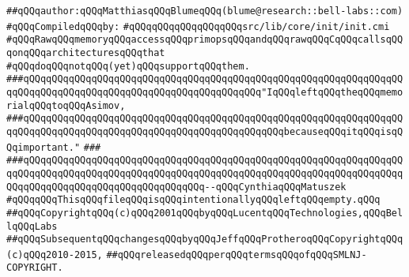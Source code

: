 \label{src/lib/core/init/rawmem-dummy.pkg}
\verb|##qQQqauthor:qQQqMatthiasqQQqBlumeqQQq(blume@research::bell-labs::com)|\newline
\newline
\verb|#qQQqCompiledqQQqby:|\newline
\verb|#qQQqqQQqqQQqqQQqqQQqsrc/lib/core/init/init.cmi|\newline
\newline
\verb|#qQQqRawqQQqmemoryqQQqaccessqQQqprimopsqQQqandqQQqrawqQQqCqQQqcallsqQQqonqQQqarchitecturesqQQqthat|\newline
\verb|#qQQqdoqQQqnotqQQq(yet)qQQqsupportqQQqthem.|\newline
\newline
\newline
\newline
\verb|###qQQqqQQqqQQqqQQqqQQqqQQqqQQqqQQqqQQqqQQqqQQqqQQqqQQqqQQqqQQqqQQqqQQqqQQqqQQqqQQqqQQqqQQqqQQqqQQqqQQqqQQqqQQqqQQq"IqQQqleftqQQqtheqQQqmemorialqQQqtoqQQqAsimov,|\newline
\verb|###qQQqqQQqqQQqqQQqqQQqqQQqqQQqqQQqqQQqqQQqqQQqqQQqqQQqqQQqqQQqqQQqqQQqqQQqqQQqqQQqqQQqqQQqqQQqqQQqqQQqqQQqqQQqqQQqqQQqbecauseqQQqitqQQqisqQQqimportant."|\newline
\verb|###|\newline
\verb|###qQQqqQQqqQQqqQQqqQQqqQQqqQQqqQQqqQQqqQQqqQQqqQQqqQQqqQQqqQQqqQQqqQQqqQQqqQQqqQQqqQQqqQQqqQQqqQQqqQQqqQQqqQQqqQQqqQQqqQQqqQQqqQQqqQQqqQQqqQQqqQQqqQQqqQQqqQQqqQQqqQQqqQQqqQQq--qQQqCynthiaqQQqMatuszek|\newline
\newline
\newline
\newline
\verb|#qQQqqQQqThisqQQqfileqQQqisqQQqintentionallyqQQqleftqQQqempty.qQQq|\newline
\newline
\newline
\verb|##qQQqCopyrightqQQq(c)qQQq2001qQQqbyqQQqLucentqQQqTechnologies,qQQqBellqQQqLabs|\newline
\verb|##qQQqSubsequentqQQqchangesqQQqbyqQQqJeffqQQqProtheroqQQqCopyrightqQQq(c)qQQq2010-2015,|\newline
\verb|##qQQqreleasedqQQqperqQQqtermsqQQqofqQQqSMLNJ-COPYRIGHT.|\newline

